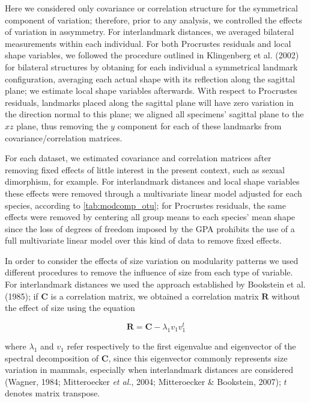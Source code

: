\documentclass[12pt,twoside]{report}
\begin{document}
Here we considered only covariance or correlation structure for the
symmetrical component of variation; therefore, prior to any analysis, we
controlled the effects of variation in assymmetry. For interlandmark
distances, we averaged bilateral measurements within each individual.
For both Procrustes residuals and local shape variables, we followed the
procedure outlined in Klingenberg et al. (2002) for bilateral structures
by obtaning for each individual a symmetrical landmark configuration,
averaging each actual shape with its reflection along the sagittal
plane; we estimate local shape variables afterwards. With respect to
Procrustes residuals, landmarks placed along the sagittal plane will
have zero variation in the direction normal to this plane; we aligned
all specimens' sagittal plane to the $xz$ plane, thus removing the $y$
component for each of these landmarks from covariance/correlation
matrices.

For each dataset, we estimated covariance and correlation matrices after
removing fixed effects of little interest in the present context, such
as sexual dimorphism, for example. For interlandmark distances and local
shape variables these effects were removed through a multivariate linear
model adjusted for each species, according to \autoref{tab:modcomp_otu};
for Procrustes residuals, the same effects were removed by centering all
group means to each species' mean shape since the loss of degrees of
freedom imposed by the GPA prohibits the use of a full multivariate
linear model over this kind of data to remove fixed effects.

In order to consider the effects of size variation on modularity
patterns we used different procedures to remove the influence of size
from each type of variable. For interlandmark distances we used the
approach established by Bookstein et al. (1985); if $\mathbf{C}$ is a
correlation matrix, we obtained a correlation matrix $\mathbf{R}$
without the effect of size using the equation

\begin{equation}
\mathbf{R} = \mathbf{C} - \lambda_1 v_1 v^{t}_1
\label{eq:iso}
\end{equation}

where $\lambda_1$ and $v_1$ refer respectively to the first eigenvalue
and eigenvector of the spectral decomposition of $\mathbf{C}$, since
this eigenvector commonly represents size variation in mammals,
especially when interlandmark distances are considered (Wagner, 1984;
Mitteroecker \emph{et al.}, 2004; Mitteroecker \& Bookstein, 2007); $t$
denotes matrix transpose.
\end{document}
